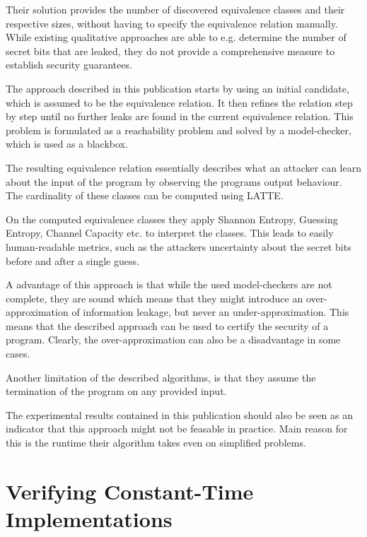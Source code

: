 \documentclass[a4paper,UKenglish]{lipics-v2018}
\begin{document}
Their solution provides the number of discovered equivalence classes and their respective sizes, without having to specify the equivalence relation manually. While existing qualitative approaches are able to e.g. determine the number of secret bits that are leaked, they do not provide a comprehensive measure to establish security guarantees.\cite{automatic_discovery_and_quantification}

The approach described in this publication starts by using an initial candidate, which is assumed to be the equivalence relation. It then refines the relation step by step until no further leaks are found in the current equivalence relation. This problem is formulated as a reachability problem and solved by a model-checker, which is used as a blackbox.\cite{automatic_discovery_and_quantification}

The resulting equivalence relation essentially describes what an attacker can learn about the input of the program by observing the programs output behaviour. The cardinality of these classes can be computed using LATTE.\cite{automatic_discovery_and_quantification}

On the computed equivalence classes they apply Shannon Entropy, Guessing Entropy, Channel Capacity etc. to interpret the classes. This leads to easily human-readable metrics, such as the attackers uncertainty about the secret bits before and after a single guess.\cite{automatic_discovery_and_quantification}

A advantage of this approach is that while the used model-checkers are not complete, they are sound which means that they might introduce an over-approximation of information leakage, but never an under-approximation. This means that the described approach can be used to certify the security of a program.\cite{automatic_discovery_and_quantification} Clearly, the over-approximation can also be a disadvantage in some cases. 

Another limitation of the described algorithms, is that they assume the termination of the program on any provided input.

The experimental results contained in this publication should also be seen as an indicator that this approach might not be feasable in practice. Main reason for this is the runtime their algorithm takes even on simplified problems.\cite{automatic_discovery_and_quantification}


\newpage
\section{Verifying Constant-Time Implementations}



\end{document}
